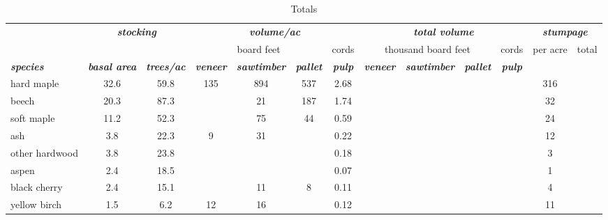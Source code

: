 \documentclass[landscape]{article}
\begin{document}
\begin{table}[H]

\caption{\label{tab:unnamed-chunk-16}Totals}
\fontsize{10}{12}\selectfont
\begin{tabular}[t]{lcccccccccccc}
\toprule
\multicolumn{1}{c}{\em{\textbf{ }}} & \multicolumn{2}{c}{\em{\textbf{stocking}}} & \multicolumn{4}{c}{\em{\textbf{volume/ac }}} & \multicolumn{4}{c}{\em{\textbf{total volume}}} & \multicolumn{2}{c}{\em{\textbf{stumpage}}} \\
\cmidrule(l{3pt}r{3pt}){2-3} \cmidrule(l{3pt}r{3pt}){4-7} \cmidrule(l{3pt}r{3pt}){8-11} \cmidrule(l{3pt}r{3pt}){12-13}
\multicolumn{3}{c}{ } & \multicolumn{3}{c}{board feet} & \multicolumn{1}{c}{cords} & \multicolumn{3}{c}{thousand board feet} & \multicolumn{1}{c}{cords} & \multicolumn{1}{c}{per acre} & \multicolumn{1}{c}{total} \\
\cmidrule(l{3pt}r{3pt}){4-6} \cmidrule(l{3pt}r{3pt}){7-7} \cmidrule(l{3pt}r{3pt}){8-10} \cmidrule(l{3pt}r{3pt}){11-11} \cmidrule(l{3pt}r{3pt}){12-12} \cmidrule(l{3pt}r{3pt}){13-13}
\rowcolor[HTML]{DCDCDC}  \em{\textbf{species}} & \em{\textbf{basal area}} & \em{\textbf{trees/ac}} & \em{\textbf{veneer}} & \em{\textbf{sawtimber}} & \em{\textbf{pallet}} & \em{\textbf{pulp}} & \em{\textbf{veneer}} & \em{\textbf{sawtimber}} & \em{\textbf{pallet}} & \em{\textbf{pulp}} & \em{\textbf{ }} & \em{\textbf{ }}\\
\midrule
\rowcolor{gray!6}  hard maple & 32.6 & 59.8 & 135 & 894 & 537 & 2.68 &  &  &  &  & 316 & \\
 
beech & 20.3 & 87.3 &  & 21 & 187 & 1.74 &  &  &  &  & 32 & \\
 
\rowcolor{gray!6}  soft maple & 11.2 & 52.3 &  & 75 & 44 & 0.59 &  &  &  &  & 24 & \\
 
ash & 3.8 & 22.3 & 9 & 31 &  & 0.22 &  &  &  &  & 12 & \\
 
\rowcolor{gray!6}  other hardwood & 3.8 & 23.8 &  &  &  & 0.18 &  &  &  &  & 3 & \\
 
aspen & 2.4 & 18.5 &  &  &  & 0.07 &  &  &  &  & 1 & \\
 
\rowcolor{gray!6}  black cherry & 2.4 & 15.1 &  & 11 & 8 & 0.11 &  &  &  &  & 4 & \\
 
yellow birch & 1.5 & 6.2 & 12 & 16 &  & 0.12 &  &  &  &  & 11 & \\
 

\end{tabular}
\end{table}
\end{document}
